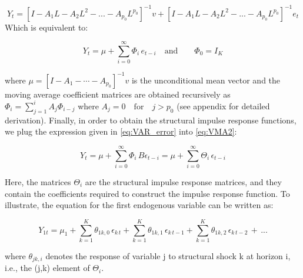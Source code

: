 \documentclass[12pt, a4paper]{article}
\begin{document}
\begin{equation} \label{eq:VMA}
    Y_t = [I-A_1L-A_2L^2-...-A_{p_0}L^{p_0}]^{-1}v + [I-A_1L-A_2L^2-...-A_{p_0}L^{p_0}]^{-1}e_t
\end{equation}
Which is equivalent to: 

\begin{equation} \label{eq:VMA2}
    Y_t = \mu + \sum_{i=0}^{\infty} \Phi_i\,e_{t-i} \quad \text{and} \qquad \Phi_0 = I_K
\end{equation}

where $\mu = [I - A_1 - \cdots - A_{p_0}]^{-1}v$ is the unconditional mean vector and the moving average coefficient matrices are obtained recursively as $\Phi_i = \sum_{j=1}^{i} A_j\Phi_{i-j}$ where $A_j = 0 \quad \text{for} \quad j>p_0$ (see appendix for detailed derivation). Finally, in order to obtain the structural impulse response functions, we plug the expression given in \eqref{eq:VAR_error} into \eqref{eq:VMA2}:

\begin{equation} \label{eq:SVAR}
    Y_t = \mu + \sum_{i=0}^{\infty} \Phi_i\,B\epsilon_{t-i} = \mu + \sum_{i=0}^{\infty} \Theta_i\,\epsilon_{t-i}
\end{equation}

Here, the matrices $\Theta_i$ are the structural impulse response matrices, and they contain the coefficients required to construct the impulse response function. To illustrate, the equation for the first endogenous variable can be written as: 

\begin{equation} \label{eq:SVAR2}
    Y_{1t} = \mu_1 + \sum_{k=1}^{K} \theta_{1k,0} \, \epsilon_{k\,t} + \sum_{k=1}^{K} \theta_{1k,1} \, \epsilon_{k\,t-1} + \sum_{k=1}^{K} \theta_{1k,2} \, \epsilon_{k\,t-2} \, + \, ...
\end{equation} 

where $\theta_{jk,i}$ denotes the response of variable j to structural shock k at horizon i, i.e., the (j,k) element of $\Theta_i$. 
\end{document}
